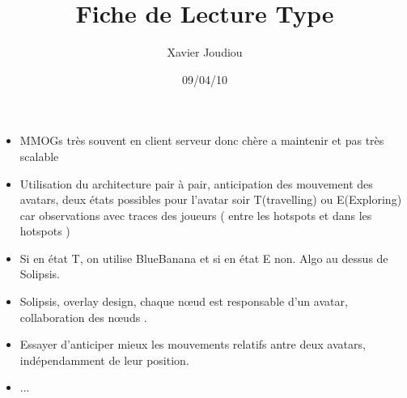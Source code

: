 \documentclass[11pt,a4paper]{article}
\title{Fiche de Lecture Type}
\author{Xavier Joudiou}
\date{09/04/10}
\begin{document}
	
  \begin{itemize}
  \renewcommand{\labelitemi}{$\Rightarrow$}
	\item MMOGs très souvent en client serveur donc chère a maintenir et pas très scalable
	\item Utilisation du architecture pair à pair, anticipation des mouvement des avatars, deux états possibles pour l'avatar soir T(travelling) ou E(Exploring) car observations avec traces des joueurs ( entre les hotspots et dans les hotspots )
	\item Si en état T, on utilise BlueBanana et si en état E non. Algo au dessus de Solipsis.
	\item Solipsis, overlay design, chaque nœud est responsable d'un avatar, collaboration des nœuds .
	\item Essayer d'anticiper mieux les mouvements relatifs antre deux avatars, indépendamment de leur position.
	\item ...
  \end{itemize}
\end{document}

